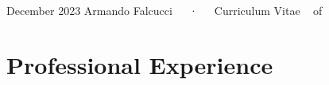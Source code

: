 \documentclass[11pt,a4paper,]{awesome-cv}
\begin{document}
\makecvheader

\makecvfooter
  {December 2023}
    {Armando Falcucci~~~·~~~Curriculum Vitae}
  {\thepage~ of \pageref{LastPage}~}





\hypertarget{professional-experience}{%
\section{Professional Experience}\label{professional-experience}}
\end{document}
